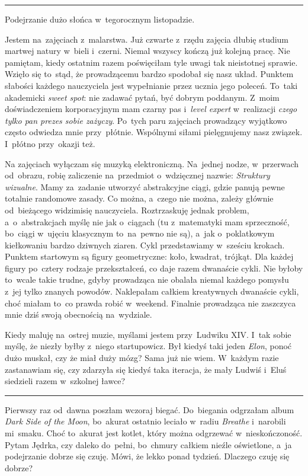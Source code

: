 \documentclass[9pt, a5paper]{memoir}
\begin{document}
\fancybreak{* \quad * \quad *}

Podejrzanie dużo słońca w~tegorocznym listopadzie.

Jestem na~zajęciach z~malarstwa. Już czwarte z~rzędu zajęcia dłubię studium martwej natury w~bieli i~czerni. Niemal wszyscy kończą już kolejną pracę. Nie pamiętam, kiedy ostatnim razem poświęciłam tyle uwagi tak nieistotnej sprawie. Wzięło się to~stąd, że prowadzącemu bardzo spodobał się nasz układ. Punktem słabości każdego nauczyciela jest wypełnianie przez ucznia jego poleceń. To~taki akademicki \textit{sweet spot}: nie zadawać pytań, być dobrym poddanym. Z~moim doświadczeniem korporacyjnym mam czarny pas i~\textit{level expert} w~realizacji \textit{czego tylko pan prezes sobie zażyczy}. Po~tych paru zajęciach prowadzący wyjątkowo często odwiedza mnie przy~płótnie. Wspólnymi siłami pielęgnujemy nasz związek. I~płótno przy~okazji też.

Na zajęciach wyłączam się muzyką elektroniczną. Na~jednej nodze, w~przerwach od~obrazu, robię zaliczenie na~przedmiot o~wdzięcznej nazwie: \textit{Struktury wizualne}. Mamy za~zadanie utworzyć abstrakcyjne ciągi, gdzie panują pewne totalnie randomowe zasady. Co można, a~czego nie można, zależy głównie od~bieżącego widzimisię nauczyciela. Roztrzaskuję jednak problem, a~o~abstrakcjach myślę nie jak o~ciągach (tu z~matematyki mam sprzeczność, bo~ciągi w~ujęciu klasycznym to~na~pewno nie są), a~jak o~poklatkowym kiełkowaniu bardzo dziwnych ziaren. Cykl przedstawiamy w~sześciu krokach. Punktem startowym są figury geometryczne: koło, kwadrat, trójkąt. Dla każdej figury po~cztery rodzaje przekształceń, co daje razem dwanaście cykli. Nie byłoby to~wcale takie trudne, gdyby prowadząca nie obalała niemal każdego pomysłu z~jej tylko znanych powodów. Naklepałam całkiem kreatywnych dwanaście cykli, choć miałam to~co prawda robić w~weekend. Finalnie prowadząca nie zaszczyca mnie dziś swoją obecnością na~wydziale.

Kiedy maluję na~ostrej muzie, myślami jestem przy~Ludwiku XIV. I~tak sobie myślę, że niezły byłby z~niego startupowicz. Był kiedyś taki jeden \textit{Elon}, ponoć dużo muskał, czy że miał duży mózg? Sama już nie wiem. W~każdym razie zastanawiam się, czy zdarzyła się kiedyś taka iteracja, że mały Ludwiś i~Eluś siedzieli razem w~szkolnej ławce?

\fancybreak{* \quad * \quad *}

Pierwszy raz od~dawna poszłam wczoraj biegać. Do~biegania odgrzałam album \textit{Dark Side of the Moon}, bo~akurat ostatnio leciało w~radiu \textit{Breathe} i~narobili mi~smaku. Choć to~akurat jest kotlet, który można odgrzewać w~nieskończoność. Pytam Jędrka, czy daleko do~pełni, bo~chmury całkiem nieźle oświetlone, a~ja podejrzanie dobrze się czuję. Mówi, że lekko ponad tydzień. Dlaczego czuję się dobrze?
\end{document}
